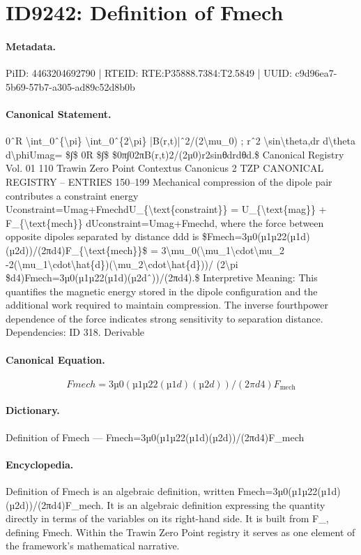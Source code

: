 \section*{ID9242: Definition of Fmech}
\paragraph{Metadata.}
PiID: 4463204692790 | RTEID: RTE:P35888.7384:T2.5849 | UUID: c9d96ea7-5b69-57b7-a305-ad89c52d8b0b

\paragraph{Canonical Statement.}
0ˆR \textbackslash{}int\_0ˆ\{\textbackslash{}pi\} \textbackslash{}int\_0ˆ\{2\textbackslash{}pi\} |B(r,t)|ˆ2/(2\textbackslash{}mu\_0) ; rˆ2 \textbackslash{}sin\textbackslash{}theta,dr d\textbackslash{}theta d\textbackslash{}phiUmag= \$∫\$ 0R \$∫\$ \$0π∫02πB(r,t)2/(2µ0)r2sinθdrdθd.\$ Canonical Registry Vol. 01 110 Trawin Zero Point Contextus Canonicus 2 TZP CANONICAL REGISTRY – ENTRIES 150–199 Mechanical compression of the dipole pair contributes a constraint energy Uconstraint=Umag+FmechdU\_\{\textbackslash{}text\{constraint\}\} = U\_\{\textbackslash{}text\{mag\}\} + F\_\{\textbackslash{}text\{mech\}\} dUconstraint=Umag+Fmechd, where the force between opposite dipoles separated by distance ddd is \$Fmech=3µ0(µ1µ22(µ1d)(µ2d))/(2πd4)F\_\{\textbackslash{}text\{mech\}\}\$ = 3\textbackslash{}mu\_0(\textbackslash{}mu\_1\textbackslash{}cdot\textbackslash{}mu\_2 -2(\textbackslash{}mu\_1\textbackslash{}cdot\textbackslash{}hat\{d\})(\textbackslash{}mu\_2\textbackslash{}cdot\textbackslash{}hat\{d\}))/ (2\textbackslash{}pi \$d4)Fmech=3µ0(µ1µ22(µ1d)(µ2dˆ))/(2πd4).\$ Interpretive Meaning: This quantifies the magnetic energy stored in the dipole configuration and the additional work required to maintain compression. The inverse fourthpower dependence of the force indicates strong sensitivity to separation distance. Dependencies: ID 318. Derivable

\paragraph{Canonical Equation.}
\[
Fmech=3µ0(µ1µ22(µ1d)(µ2d))/(2πd4)F_{\text{mech}}
\]

\paragraph{Dictionary.}
Definition of Fmech — Fmech=3µ0(µ1µ22(µ1d)(µ2d))/(2πd4)F\_mech

\paragraph{Encyclopedia.}
Definition of Fmech is an algebraic definition, written Fmech=3µ0(µ1µ22(µ1d)(µ2d))/(2πd4)F\_mech. It is an algebraic definition expressing the quantity directly in terms of the variables on its right-hand side. It is built from F\_, defining Fmech. Within the Trawin Zero Point registry it serves as one element of the framework's mathematical narrative.
